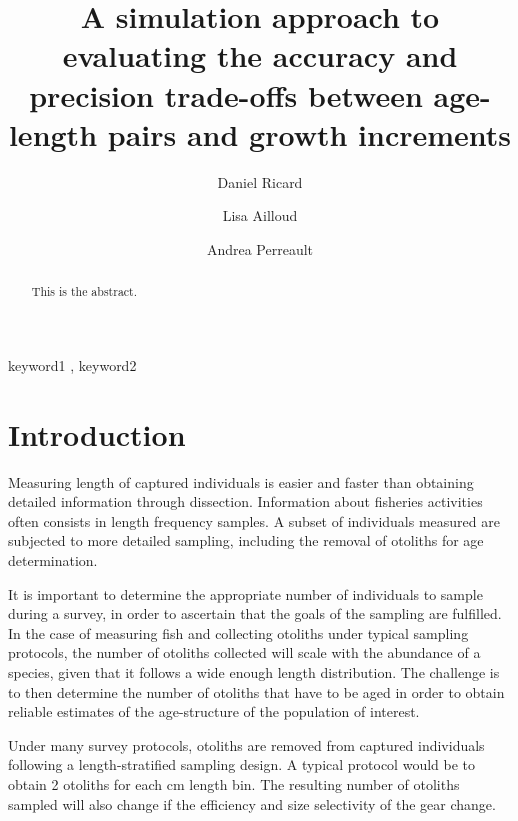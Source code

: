 \documentclass[preprint, 3p,
authoryear]{elsarticle} %
\begin{document}
\begin{frontmatter}

  \title{A simulation approach to evaluating the accuracy and precision
trade-offs between age-length pairs and growth increments}
    \author[DFO-Gulf]{Daniel Ricard%
  }
    \author[NOAA-NMFS]{Lisa Ailloud%
  }
    \author[DFO-Nfld]{Andrea Perreault%
  }
  
  \begin{abstract}
  This is the abstract.
  \end{abstract}
    \begin{keyword}
    keyword1 \sep 
    keyword2
  \end{keyword}
  
 \end{frontmatter}

\hypertarget{introduction}{%
\section{Introduction}\label{introduction}}

Measuring length of captured individuals is easier and faster than
obtaining detailed information through dissection. Information about
fisheries activities often consists in length frequency samples. A
subset of individuals measured are subjected to more detailed sampling,
including the removal of otoliths for age determination.

It is important to determine the appropriate number of individuals to
sample during a survey, in order to ascertain that the goals of the
sampling are fulfilled. In the case of measuring fish and collecting
otoliths under typical sampling protocols, the number of otoliths
collected will scale with the abundance of a species, given that it
follows a wide enough length distribution. The challenge is to then
determine the number of otoliths that have to be aged in order to obtain
reliable estimates of the age-structure of the population of interest.

Under many survey protocols, otoliths are removed from captured
individuals following a length-stratified sampling design. A typical
protocol would be to obtain 2 otoliths for each cm length bin. The
resulting number of otoliths sampled will also change if the efficiency
and size selectivity of the gear change.
\end{document}
